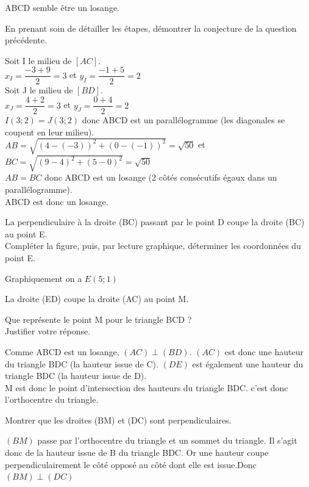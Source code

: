 \documentclass[11pt,a4paper]{article}  %
\begin{document}
\begin{enumMet}
\begin{enumMet}
\begin{corrBox}
			ABCD semble être un losange.
		\end{corrBox}
		\item En prenant soin de détailler les étapes, démontrer la conjecture de la question précédente.
		\begin{corrBox}
			Soit I le milieu de $[AC]$.\\
			$x_I=\dfrac{-3+9}{2}=3$ et $y_I=\dfrac{-1+5}{2}=2$\\
			Soit J le milieu de $[BD]$.\\
			$x_J=\dfrac{4+2}{2}=3$ et $y_J=\dfrac{0+4}{2}=2$\\
			$I(3;2)=J(3;2)$ donc ABCD est un parallélogramme (les diagonales se coupent en leur milieu).\\
			$AB=\sqrt{(4-(-3))^2+(0-(-1))^2}=\sqrt{50}$ et $BC=\sqrt{(9-4)^2+(5-0)^2}=\sqrt{50}$\\
			$AB= BC$ donc ABCD est un losange (2 côtés consécutifs égaux dans un parallélogramme).\\
			ABCD est donc un losange.
		\end{corrBox}
	\end{enumMet}
	\item La perpendiculaire à la droite (BC) passant par le point D coupe la droite (BC) au point E.\\
	Compléter la figure, puis, par lecture graphique, déterminer les coordonnées du point E.
	\begin{corrBox}
		Graphiquement on a $E(5;1)$
	\end{corrBox}
	\item La droite (ED) coupe la droite (AC) au point M.
	\begin{enumMet} 
		\item Que représente le point M pour le triangle BCD ? \\Justifier votre réponse.
		\begin{corrBox}
			Comme ABCD est un losange, $(AC)\perp(BD)$. $(AC)$ est donc une hauteur du triangle BDC (la hauteur issue de C). $(DE)$ est également une hauteur du triangle BDC (la hauteur issue de D).\\
			M est donc le point d'intersection des hauteurs du triangle BDC. c'est donc l'orthocentre du triangle.
		\end{corrBox}
		\item Montrer que les droites (BM) et (DC) sont perpendiculaires.
		\begin{corrBox}
			$(BM)$ passe par l'orthocentre du triangle et un sommet du triangle. Il s'agit donc de la hauteur issue de B du triangle BDC. Or une hauteur coupe perpendiculairement le côté opposé au côté dont elle est issue.Donc $(BM)\perp(DC)$
		\end{corrBox}
	\end{enumMet}
\end{enumMet}
\end{document}
